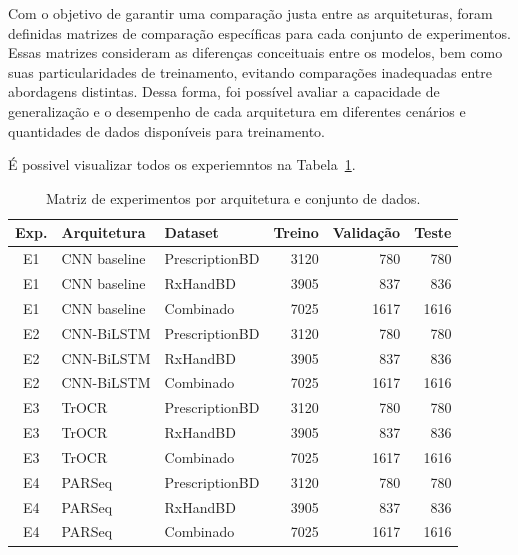 \documentclass[11pt,a4paper]{article}
\begin{document}
Com o objetivo de garantir uma comparação justa entre as arquiteturas, foram definidas matrizes de comparação específicas para cada conjunto de experimentos. Essas matrizes consideram as diferenças conceituais entre os modelos, bem como suas particularidades de treinamento, evitando comparações inadequadas entre abordagens distintas. Dessa forma, foi possível avaliar a capacidade de generalização e o desempenho de cada arquitetura em diferentes cenários e quantidades de dados disponíveis para treinamento.

É possivel visualizar todos os experiemntos na Tabela~\ref{tab:matriz-experimentos}.
\begin{table}[H]
	\centering
	\caption{Matriz de experimentos por arquitetura e conjunto de dados.}
	\label{tab:matriz-experimentos}
	\begin{tabular}{cllrrr}
		\toprule
		\textbf{Exp.} &
		\textbf{Arquitetura} &
		\textbf{Dataset} &
		\textbf{Treino} &
		\textbf{Validação} &
		\textbf{Teste} \\
		\midrule
		
		E1 & CNN baseline & PrescriptionBD & 3120 & 780  & 780  \\
		E1 & CNN baseline & RxHandBD       & 3905 & 837  & 836  \\
		E1 & CNN baseline & Combinado      & 7025 & 1617 & 1616 \\
		\midrule
		
		E2 & CNN-BiLSTM   & PrescriptionBD & 3120 & 780  & 780  \\
		E2 & CNN-BiLSTM   & RxHandBD       & 3905 & 837  & 836  \\
		E2 & CNN-BiLSTM   & Combinado      & 7025 & 1617 & 1616 \\
		\midrule
		
		E3 & TrOCR        & PrescriptionBD & 3120 & 780  & 780  \\
		E3 & TrOCR        & RxHandBD       & 3905 & 837  & 836  \\
		E3 & TrOCR        & Combinado      & 7025 & 1617 & 1616 \\
		\midrule
		
		E4 & PARSeq       & PrescriptionBD & 3120 & 780  & 780  \\
		E4 & PARSeq       & RxHandBD       & 3905 & 837  & 836  \\
		E4 & PARSeq       & Combinado      & 7025 & 1617 & 1616 \\
		\bottomrule
	\end{tabular}
\end{table}
\end{document}
